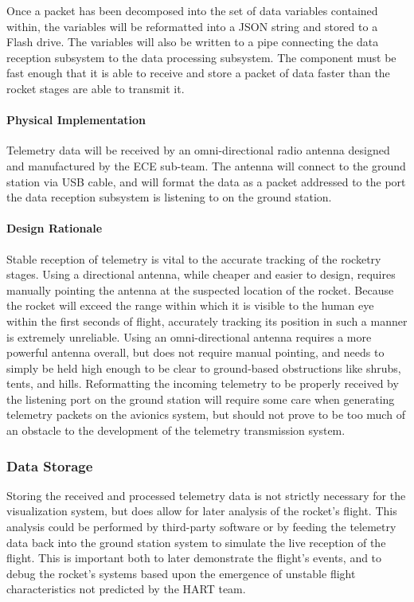 \documentclass[journal,10pt,onecolumn,compsoc]{IEEEtran}
\begin{document}
				\noindent Once a packet has been decomposed into the set of data variables contained within, the variables will be reformatted into a JSON string and stored to a Flash drive.
				The variables will also be written to a pipe connecting the data reception subsystem to the data processing subsystem.
				The component must be fast enough that it is able to receive and store a packet of data faster than the rocket stages are able to transmit it.

			\paragraph{Physical Implementation}
				\noindent Telemetry data will be received by an omni-directional radio antenna designed and manufactured by the ECE sub-team.
				The antenna will connect to the ground station via USB cable, and will format the data as a packet addressed to the port the data reception subsystem is listening to on the ground station.

			\paragraph{Design Rationale}
				\noindent Stable reception of telemetry is vital to the accurate tracking of the rocketry stages.
				Using a directional antenna, while cheaper and easier to design, requires manually pointing the antenna at the suspected location of the rocket.
				Because the rocket will exceed the range within which it is visible to the human eye within the first seconds of flight, accurately tracking its position in such a manner is extremely unreliable.
				Using an omni-directional antenna requires a more powerful antenna overall, but does not require manual pointing, and needs to simply be held high enough to be clear to ground-based obstructions like shrubs, tents, and hills.
				Reformatting the incoming telemetry to be properly received by the listening port on the ground station will require some care when generating telemetry packets on the avionics system, but should not prove to be too much of an obstacle to the development of the telemetry transmission system.

		\subsubsection{Data Storage}
			\noindent Storing the received and processed telemetry data is not strictly necessary for the visualization system, but does allow for later analysis of the rocket's flight.
			This analysis could be performed by third-party software or by feeding the telemetry data back into the ground station system to simulate the live reception of the flight.
			This is important both to later demonstrate the flight's events, and to debug the rocket's systems based upon the emergence of unstable flight characteristics not predicted by the HART team.
\end{document}
